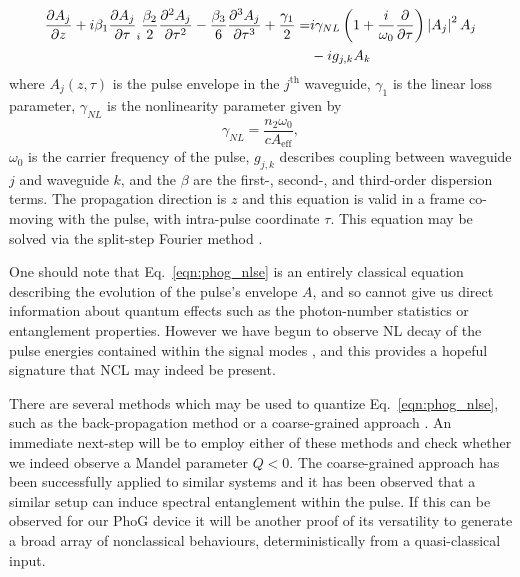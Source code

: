\begin{align}\label{eqn:phog_nlse}
\frac{\partial A_j}{\partial z} + i \beta_1 \frac{\partial A_j}{\partial \tau} _ i \frac{\beta_2}{2} \frac{\partial^2 A_j}{\partial \tau^2} - \frac{\beta_3}{6} \frac{\partial^3 A_j}{\partial \tau^3} + \frac{\gamma_1}{2} = &i \gamma_{NL} \left( 1 + \frac{i}{\omega_0} \frac{\partial}{\partial \tau}\right)\left|A_j\right|^2 A_j \notag \\
&- i g_{j, k} A_k
\end{align}
where $A_j\left(z, \tau\right)$ is the pulse envelope in the $j^{\text{th}}$ waveguide, $\gamma_1$ is the linear loss parameter, $\gamma_{NL}$ is the nonlinearity parameter given by
\begin{equation}
\gamma_{NL} = \frac{n_2 \omega_0}{c A_{\text{eff}}},
\end{equation}
$\omega_0$ is the carrier frequency of the pulse, $g_{j, k}$ describes coupling between waveguide $j$ and waveguide $k$, and the $\beta$ are the first-, second-, and third-order dispersion terms. The propagation direction is $z$ and this equation is valid in a frame co-moving with the pulse, with intra-pulse coordinate $\tau$. This equation may be solved via the split-step Fourier method \cite{Agrawal2012}.

One should note that Eq.~\ref{eqn:phog_nlse} is an entirely classical equation describing the evolution of the pulse's envelope $A$, and so cannot give us direct information about quantum effects such as the photon-number statistics or entanglement properties. However we have begun to observe NL decay of the pulse energies contained within the signal modes \cite{Thornton2019a}, and this provides a hopeful signature that NCL may indeed be present.

There are several methods which may be used to quantize Eq.~\ref{eqn:phog_nlse}, such as the back-propagation method \cite{Lai1995, Hosaka2015, Mecozzi1997} or a coarse-grained approach \cite{Hosaka2016, Nishizawa1999, Fiorentino2002, Ju2012, Doerr1994}. An immediate next-step will be to employ either of these methods and check whether we indeed observe a Mandel parameter $Q < 0$. The coarse-grained approach has been successfully applied to similar systems and it has been observed \cite{Ju2012} that a similar setup can induce spectral entanglement within the pulse. If this can be observed for our PhoG device it will be another proof of its versatility to generate a broad array of nonclassical behaviours, deterministically from a quasi-classical input.


